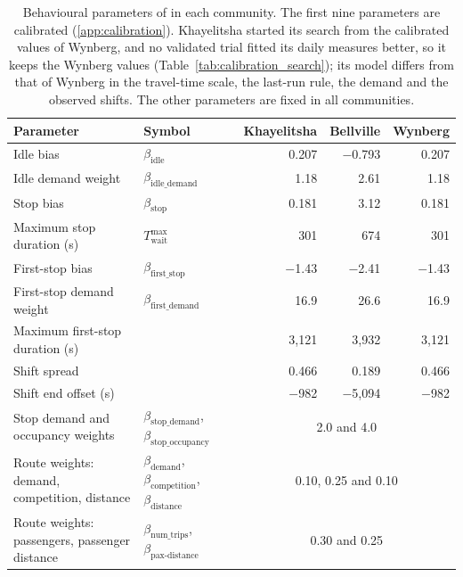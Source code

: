 \begin{table}[htbp]
    \centering
    \footnotesize
    \caption[Behavioural parameters of \MA{} in each community]{Behavioural parameters of \MA{} in each community. The first nine parameters are calibrated (\ref{app:calibration}). Khayelitsha started its search from the calibrated values of Wynberg, and no validated trial fitted its daily measures better, so it keeps the Wynberg values (Table~\ref{tab:calibration_search}); its model differs from that of Wynberg in the travel-time scale, the last-run rule, the demand and the observed shifts. The other parameters are fixed in all communities.}
    \label{tab:abm_parameters}
    \begin{tabularx}{\linewidth}{@{}Xlrrr@{}}
        \toprule
        \textbf{Parameter} & Symbol & Khayelitsha & Bellville & Wynberg \\
        \midrule
        Idle bias & $\beta_{\text{idle}}$ & 0.207 & $-$0.793 & 0.207 \\
        Idle demand weight & $\beta_{\text{idle\_demand}}$ & 1.18 & 2.61 & 1.18 \\
        Stop bias & $\beta_{\text{stop}}$ & 0.181 & 3.12 & 0.181 \\
        Maximum stop duration (s) & $T_{\text{wait}}^{\text{max}}$ & 301 & 674 & 301 \\
        First-stop bias & $\beta_{\text{first\_stop}}$ & $-$1.43 & $-$2.41 & $-$1.43 \\
        First-stop demand weight & $\beta_{\text{first\_demand}}$ & 16.9 & 26.6 & 16.9 \\
        Maximum first-stop duration (s) & & 3,121 & 3,932 & 3,121 \\
        Shift spread & & 0.466 & 0.189 & 0.466 \\
        Shift end offset (s) & & $-$982 & $-$5,094 & $-$982 \\
        \addlinespace
        Stop demand and occupancy weights & $\beta_{\text{stop\_demand}}$, $\beta_{\text{stop\_occupancy}}$ & \multicolumn{3}{c}{2.0 and 4.0} \\
        Route weights: demand, competition, distance & $\beta_{\text{demand}}$, $\beta_{\text{competition}}$, $\beta_{\text{distance}}$ & \multicolumn{3}{c}{0.10, 0.25 and 0.10} \\
        Route weights: passengers, passenger distance & $\beta_{\text{num\_trips}}$, $\beta_{\text{pax-distance}}$ & \multicolumn{3}{c}{0.30 and 0.25} \\

\end{tabularx}
\end{table}
